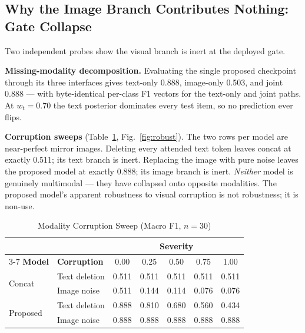 \documentclass[conference]{IEEEtran}
\begin{document}
\subsection{Why the Image Branch Contributes Nothing: Gate Collapse}
\label{sec:gatecollapse}

Two independent probes show the visual branch is inert at the deployed gate.

\textbf{Missing-modality decomposition.} Evaluating the single proposed checkpoint
through its three interfaces gives text-only 0.888, image-only 0.503, and joint
0.888 --- with byte-identical per-class F1 vectors for the text-only and joint
paths. At $w_t{=}0.70$ the text posterior dominates every test item, so no
prediction ever flips.

\textbf{Corruption sweeps} (Table~\ref{tab:robust}, Fig.~\ref{fig:robust}). The
two rows per model are near-perfect mirror images. Deleting every attended text
token leaves concat at exactly 0.511; its text branch is inert. Replacing the
image with pure noise leaves the proposed model at exactly 0.888; its image branch
is inert. \emph{Neither} model is genuinely multimodal --- they have collapsed onto
opposite modalities. The proposed model's apparent robustness to visual
corruption is not robustness; it is non-use.

\begin{table}[t]
\caption{Modality Corruption Sweep (Macro F1, $n{=}30$)}
\label{tab:robust}
\centering\footnotesize
\setlength\tabcolsep{2.6pt}
\begin{tabular}{llccccc}
\toprule
& & \multicolumn{5}{c}{\textbf{Severity}}\\
\cmidrule(lr){3-7}
\textbf{Model} & \textbf{Corruption} & 0.00 & 0.25 & 0.50 & 0.75 & 1.00\\
\midrule
\multirow{2}{*}{Concat} & Text deletion & 0.511 & 0.511 & 0.511 & 0.511 & 0.511\\
                        & Image noise   & 0.511 & 0.144 & 0.114 & 0.076 & 0.076\\
\midrule
\multirow{2}{*}{Proposed} & Text deletion & 0.888 & 0.810 & 0.680 & 0.560 & 0.434\\
                          & Image noise   & 0.888 & 0.888 & 0.888 & 0.888 & 0.888\\
\bottomrule
\end{tabular}
\end{table}
\end{document}
